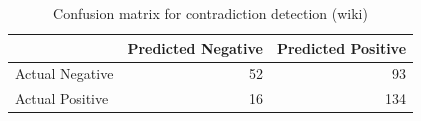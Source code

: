 \begin{table}
\caption{Confusion matrix for contradiction detection (wiki)}
\label{tab:confusion_matrix}
\begin{tabular}{lrr}
\toprule
 & Predicted Negative & Predicted Positive \\
\midrule
Actual Negative & 52 & 93 \\
Actual Positive & 16 & 134 \\
\bottomrule
\end{tabular}
\end{table}

